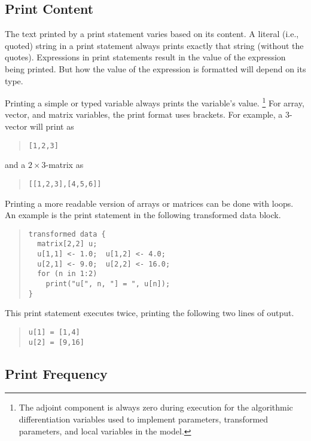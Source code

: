 \subsection{Print Content}

The text printed by a print statement varies based on its content.  A
literal (i.e., quoted) string in a print statement always prints
exactly that string (without the quotes).  Expressions in print
statements result in the value of the expression being printed.
But how the value of the expression is formatted will depend on its type.

Printing a simple  or  typed variable always
prints the variable's value.%
%
\footnote{The adjoint component is always zero during execution for
  the algorithmic differentiation variables used to implement
  parameters, transformed parameters, and local variables in the model.}
%
For array, vector, and matrix variables, the print format uses
brackets.  For example, a 3-vector will print as
%
\begin{quote}
\begin{Verbatim}[fontsize=\small]
[1,2,3]
\end{Verbatim}
\end{quote}
%
and a $2 \times 3$-matrix as 
%
\begin{quote}
\begin{Verbatim}[fontsize=\small]
[[1,2,3],[4,5,6]]
\end{Verbatim}
\end{quote}
%

Printing a more readable version of arrays or matrices can be done
with loops.  An example is the print statement in the following
transformed data block.
%
\begin{quote}
\begin{Verbatim}[fontsize=\small]
transformed data {
  matrix[2,2] u;  
  u[1,1] <- 1.0;  u[1,2] <- 4.0;    
  u[2,1] <- 9.0;  u[2,2] <- 16.0;
  for (n in 1:2)
    print("u[", n, "] = ", u[n]);
}
\end{Verbatim}
\end{quote}
%
This print statement executes twice, printing the following two lines
of output.
%
\begin{quote}
\begin{Verbatim}[fontsize=\small]
u[1] = [1,4]
u[2] = [9,16]
\end{Verbatim}
\end{quote}



\subsection{Print Frequency}

